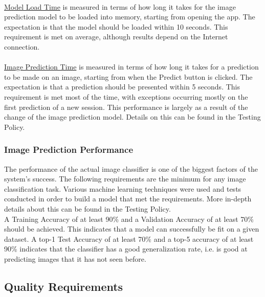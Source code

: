 \documentclass[a4paper, 11pt]{article}
\begin{document}
            \paragraph{}
            \underline{Model Load Time} is measured in terms of how long it takes for the image prediction model to be loaded into memory, starting from opening the app. The expectation is that the model should be loaded within 10 seconds. This requirement is met on average, although results depend on the Internet connection.
            
            \paragraph{}
            \underline{Image Prediction Time} is measured in terms of how long it takes for a prediction to be made on an image, starting from when the Predict button is clicked. The expectation is that a prediction should be presented within 5 seconds. This requirement is met most of the time, with exceptions occurring mostly on the first prediction of a new session. This performance is largely as a result of the change of the image prediction model. Details on this can be found in the Testing Policy.
            
        \subsubsection{Image Prediction Performance}
        The performance of the actual image classifier is one of the biggest factors of the system’s success. The following requirements are the minimum for any image classification task. Various machine learning techniques were used and tests conducted in order to build a model that met the requirements. More in-depth details about this can be found in the Testing Policy.\\
        
        A Training Accuracy of at least 90\% and a Validation Accuracy of at least 70\% should be achieved. This indicates that a model can successfully be fit on a given dataset.
        A top-1 Test Accuracy of at least 70\% and a top-5 accuracy of at least 90\% indicates that the classifier has a good generalization rate, i.e. is good at predicting images that it has not seen before.
        
    \subsection{Quality Requirements}
\end{document}
